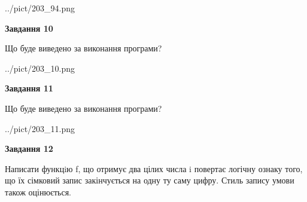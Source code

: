 \documentclass[12pt, ukrainian]{article}
\begin{document}
{\begin {large}
\begin{center}
	{../pict/203_94.png}
\end{center}
\newpage

{\begin {center}\textbf{Завдання 10}\end {center}}

Що буде виведено за виконання програми?\par
\begin{center}
	{../pict/203_10.png}
\end{center}
\newpage

{\begin {center}\textbf{Завдання 11}\end {center}}

Що буде виведено за виконання програми?\par
\begin{center}
	{../pict/203_11.png}
\end{center}
\newpage

{\begin {center}\textbf{Завдання 12}\end {center}}


Написати функцiю f, що отримує два цілих числа i повертає логічну ознаку того, що їх сімковий запис закінчується на одну ту саму цифру. Стиль запису умови також оцінюється.\par
\newpage

\end {large}}
\end{document}
